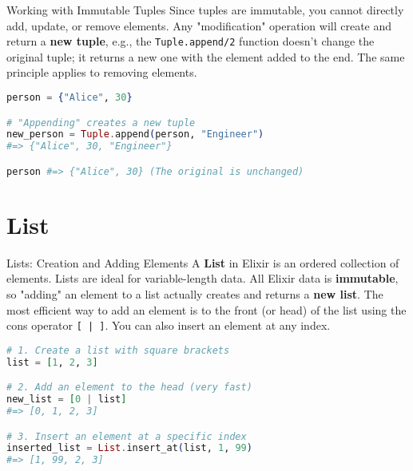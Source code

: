 \documentclass[aspectratio=169, table]{beamer}
\begin{document}
\begin{frame}[fragile]{Working with Immutable Tuples}
\vspace{20pt}
Since tuples are immutable, you cannot directly add, update, or remove elements. Any "modification" operation will create and return a \textbf{new tuple}, e.g., the \texttt{Tuple.append/2} function doesn't change the original tuple; it returns a new one with the element added to the end. The same principle applies to removing elements.

\begin{lstlisting}[language=Elixir]
person = {"Alice", 30}

# "Appending" creates a new tuple
new_person = Tuple.append(person, "Engineer")
#=> {"Alice", 30, "Engineer"}

person #=> {"Alice", 30} (The original is unchanged)
\end{lstlisting}
\end{frame}

\section{List}

\begin{frame}[fragile]{Lists: Creation and Adding Elements}
\vspace{20pt}
A \textbf{List} in Elixir is an ordered collection of elements. Lists are ideal for variable-length data. All Elixir data is \textbf{immutable}, so "adding" an element to a list actually creates and returns a \textbf{new list}. The most efficient way to add an element is to the front (or head) of the list using the cons operator \texttt{[ | ]}. You can also insert an element at any index.

\begin{lstlisting}[language=Elixir]
# 1. Create a list with square brackets
list = [1, 2, 3]

# 2. Add an element to the head (very fast)
new_list = [0 | list]
#=> [0, 1, 2, 3]

# 3. Insert an element at a specific index
inserted_list = List.insert_at(list, 1, 99)
#=> [1, 99, 2, 3]
\end{lstlisting}
\end{frame}
\end{document}
